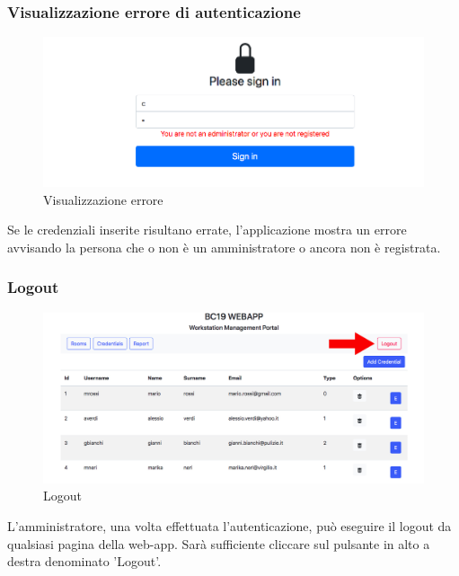 \subsubsection{Visualizzazione errore di autenticazione}
\begin{figure}[H]
	\centering
	\includegraphics[width=15cm]{res/images/error.png}
	\caption{Visualizzazione errore}
\end{figure}
Se le credenziali inserite risultano errate, l’applicazione mostra un errore avvisando la persona che o non è un amministratore o ancora non è registrata.

\subsubsection{Logout}
\begin{figure}[H]
	\centering
	\includegraphics[width=15cm]{res/images/logout.jpg}
	\caption{Logout}
\end{figure}
L'amministratore, una volta effettuata l'autenticazione, può eseguire il logout da qualsiasi pagina della web-app. Sarà sufficiente cliccare sul pulsante in alto a destra denominato 'Logout'.

